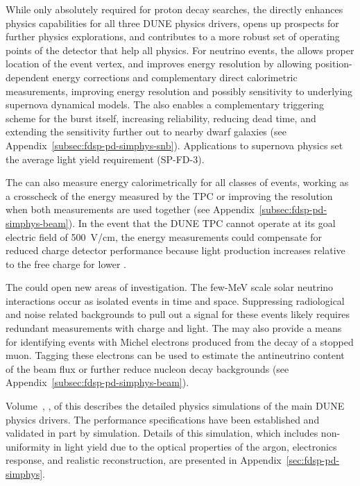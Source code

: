 While only absolutely required for proton decay searches, the  directly enhances physics capabilities for all three DUNE physics drivers, opens up prospects for further physics explorations, and contributes to a more robust set of operating points of the detector that help all physics.   For  neutrino events, the  allows proper location of the event vertex, and improves energy resolution by allowing position-dependent energy corrections and complementary direct calorimetric measurements, 
improving energy resolution and possibly sensitivity to underlying supernova dynamical models.  The  also enables a complementary triggering scheme for the burst itself, increasing 
reliability, reducing dead time, and extending the sensitivity further out to nearby dwarf galaxies (see Appendix~\ref{subsec:fdsp-pd-simphys-snb}). Applications to supernova physics set the average light yield requirement (SP-FD-3).


The  can also measure energy calorimetrically for all classes of events, working as a crosscheck of the energy measured by the TPC or improving the resolution when both measurements are used together (see Appendix~\ref{subsec:fdsp-pd-simphys-beam}).  In the event that the DUNE TPC cannot operate at its goal electric field of \SI{500}{V/cm}, the  energy measurements could compensate for reduced charge detector performance because light production increases relative to the free charge for lower \efield{}.

The  could open new areas of investigation.  The few-MeV scale solar neutrino interactions occur as isolated events in time and space.  Suppressing radiological and noise related backgrounds to pull out a signal for these events likely requires redundant measurements with charge and light.  The  may also provide a means for identifying events with Michel electrons produced from the decay of a stopped muon. Tagging these electrons can be used to estimate the antineutrino content of the beam flux or further reduce nucleon decay backgrounds (see Appendix~\ref{subsec:fdsp-pd-simphys-beam}).
 

Volume~\volnumberphysics{}, \voltitlephysics{},  of this  describes the detailed physics simulations of the main DUNE physics drivers.  
The  performance specifications have been established and validated in part by simulation.  Details of this simulation, which includes non-uniformity in light yield due to the optical properties of the argon, electronics response, and realistic reconstruction, are presented in Appendix~\ref{sec:fdsp-pd-simphys}.


